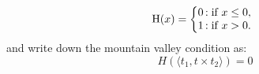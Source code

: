 \begin{equation} \label{eq:heaviside}
\text{H}(x) = \left\{
     \begin{array}{@{}l@{\thinspace}l}
       0  &: \text{if } x \leq 0, \\
       1 &: \text{if } x > 0. \\
     \end{array}
   \right.
\end{equation}
and write down the mountain valley condition as:
\begin{equation} \label{eq:mountain_valley}
H(\langle t_1, t \times t_2 \rangle) = 0
\end{equation}